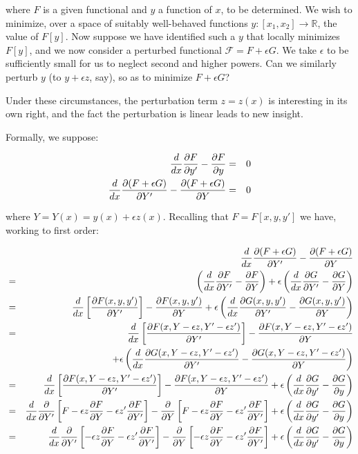 \documentclass[pdflatex,sn-mathphys-num]{sn-jnl}%
\theoremstyle{thmstyleone}%
\theoremstyle{thmstyletwo}%
\theoremstyle{thmstylethree}%
\begin{document}
\noindent where $F$ is a given functional and $y$ a function of $x$,
to be determined.  We wish to minimize, over a space of suitably
well-behaved functions
$y\colon\left[x_1,x_2\right]\longrightarrow\mathbb{R}$, the value of
$F[y]$.  Now suppose we have identified such a $y$ that locally
minimizes $F[y]$, and we now consider a perturbed functional
$\mathcal{F}=F+\epsilon G$.  We take $\epsilon$ to be sufficiently
small for us to neglect second and higher powers.  Can we similarly
perturb $y$ (to $y+\epsilon z$, say), so as to minimize $F+\epsilon
G$?

Under these circumstances, the perturbation term $z=z(x)$ is
interesting in its own right, and the fact the perturbation is linear
leads to new insight.

Formally, we suppose:

\begin{eqnarray}
  \frac{d}{dx}\frac{\partial{F}}{\partial{y'}}-\frac{\partial{F}}{\partial{y}} &=& 0\nonumber\\
  \frac{d}{dx}\frac{\partial{(F+\epsilon G)}}{\partial{Y'}}-\frac{\partial{(F+\epsilon G)}}{\partial{Y}} &=& 0
\end{eqnarray}

where $Y=Y(x) = y(x) + \epsilon z(x)$. Recalling that $F=F[x,y,y']$ we
have, working to first order:

\begin{eqnarray}
  {} &{}&
  \frac{d}{dx}\frac{\partial{(F+\epsilon G)}}{\partial{Y'}}-\frac{\partial{(F+\epsilon G)}}{\partial{Y}}\nonumber\\
  &=&  \left(\frac{d}{dx}\frac{\partial{F}}{\partial{Y'}}-\frac{\partial{F}}{\partial{Y}}\right) + \epsilon\left(\frac{d}{dx}\frac{\partial{G}}{\partial{Y'}}-\frac{\partial{G}}{\partial{Y}}\right)\nonumber\\
  &=&  \frac{d}{dx}\left[\frac{\partial{F(x,y,y')}}{\partial{Y'}}\right] - \frac{\partial{F(x,y,y')}}{\partial{Y}}
  + \epsilon\left(\frac{d}{dx}\frac{\partial{G(x,y,y')}}{\partial{Y'}}-\frac{\partial{G(x,y,y')}}{\partial{Y}}\right)\nonumber\\
  &=&  \frac{d}{dx}\left[\frac{\partial{F(x,Y-\epsilon z,Y'-\epsilon z')}}{\partial{Y'}}\right] -\frac{\partial{F(x,Y-\epsilon z,Y'-\epsilon z')}}{\partial{Y}}\nonumber\\
  &{}&\qquad  + \epsilon\left(\frac{d}{dx}\frac{\partial{G(x,Y-\epsilon z,Y'-\epsilon z')}}{\partial{Y'}}-\frac{\partial{G(x,Y-\epsilon z,Y'-\epsilon z')}}{\partial{Y}}\right)\nonumber\\
  &=&  \frac{d}{dx}\left[\frac{\partial{F(x,Y-\epsilon z,Y'-\epsilon z')}}{\partial{Y'}}\right]-\frac{\partial{F(x,Y-\epsilon z,Y'-\epsilon z')}}{\partial{Y}}
  + \epsilon\left(\frac{d}{dx}\frac{\partial{G}}{\partial{y'}} - \frac{\partial{G}}{\partial{y}}\right)\nonumber\\
  &=&  \frac{d}{dx}\frac{\partial{}}{\partial{Y'}}\left[F -\epsilon z\frac{\partial{F}}{\partial{Y}} - \epsilon z'\frac{\partial{F}}{\partial{Y'}}\right]
  - \frac{\partial{}}{\partial{Y}}\left[F -\epsilon z\frac{\partial{F}}{\partial{Y}} - \epsilon z'\frac{\partial{F}}{\partial{Y'}}\right]
  + \epsilon\left(\frac{d}{dx}\frac{\partial{G}}{\partial{y'}} - \frac{\partial{G}}{\partial{y}}\right)\nonumber\\
  &=&  \frac{d}{dx}\frac{\partial{}}{\partial{Y'}}\left[-\epsilon z\frac{\partial{F}}{\partial{Y}} - \epsilon z'\frac{\partial{F}}{\partial{Y'}}\right]
  - \frac{\partial{}}{\partial{Y}}\left[-\epsilon z\frac{\partial{F}}{\partial{Y}} - \epsilon z'\frac{\partial{F}}{\partial{Y'}}\right]
  + \epsilon\left(\frac{d}{dx}\frac{\partial{G}}{\partial{y'}} - \frac{\partial{G}}{\partial{y}}\right)\nonumber\\
\end{eqnarray}
\end{document}
